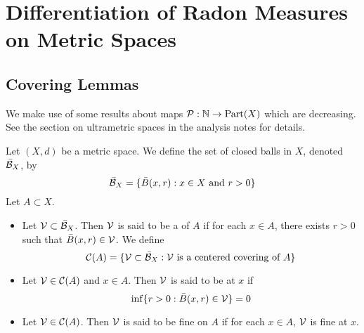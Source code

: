 \documentclass{book}
\begin{document}
	









	
	
	
	
	
	
	
	
	
	
	
	
	
	
	
	
	
	
	
	
	
	
	
	
	
	
	
	
	
	
	
	
	
	
	
	
	
	
	
	
	
	
	
	
	
	
	\newpage
	\section{Differentiation of Radon Measures on Metric Spaces}
	
	\subsection{Covering Lemmas}
	
	
	\begin{note}
		We make use of some results about maps $\mathcal{P}: \mathbb{N} \rightarrow \operatorname*{\text{Part}}(X)$ which are decreasing. See the section on ultrametric spaces in the analysis notes for details. 
	\end{note}
	
	\begin{defn} 
		Let $(X,d)$ be a metric space. We define the set of closed balls in $X$, denoted $\bar{\mathcal{B}}_X$, by
		$$\bar{\mathcal{B}}_X =  \{\bar{B}(x, r): x \in X \text{ and } r > 0\}$$
		Let $A \subset X$. 
		\begin{itemize}
			\item Let $\mathcal{V} \subset \bar{\mathcal{B}}_X$. Then $\mathcal{V}$ is said to be a  of $A$ if for each $x \in A$, there exists $r > 0$ such that $\bar{B}(x, r) \in \mathcal{V}$. We define 
			$$\mathcal{C}(A) = \{ \mathcal{V} \subset \bar{\mathcal{B}}_X: \mathcal{V} \text{ is a centered covering of } A\}$$
			\item Let $\mathcal{V} \in \mathcal{C}(A)$ and $x \in A$. Then $\mathcal{V}$ is said to be  at $x$ if 
			$$\inf \{r > 0 : \bar{B}(x,r) \in \mathcal{V}\} = 0$$
			\item Let $\mathcal{V} \in \mathcal{C}(A)$. Then $\mathcal{V}$ is said to be fine on $A$ if for each $x \in A$, $\mathcal{V}$ is fine at $x$.
		\end{itemize}
	\end{defn}
	
\end{document}

